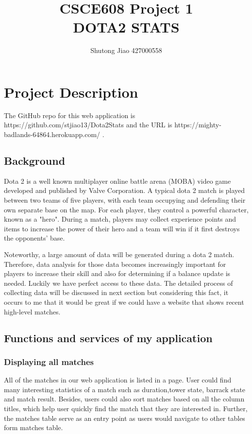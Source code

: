 \documentclass[a4paper]{article}
\title{CSCE608 Project 1\\
DOTA2 STATS}
\author{Shutong Jiao 427000558}
\begin{document}
\maketitle
\section{Project Description}
The GitHub repo for this web application is https://github.com/stjiao13/Dota2Stats and the URL is https://mighty-badlands-64864.herokuapp.com/ .
\subsection{Background}
Dota 2 is a well known multiplayer online battle arena (MOBA) video game developed and published by Valve Corporation. A typical dota 2 match is played between two teams of five players, with each team occupying and defending their own separate base on the map. For each player, they control a powerful character, known as a "hero". During a match, players may collect experience points and items to increase the power of their hero and a team will win if it first destroys the opponents' base.\par
\noindent Noteworthy, a large amount of data will be generated during a dota 2 match. Therefore, data analysis for those data becomes increasingly important for players to increase their skill and also for determining if a balance update is needed. Luckily we have perfect access to these data. The detailed process of collecting data will be discussed in next section but considering this fact, it occurs to me that it would be great if we could have a website that shows recent high-level matches. 
\subsection{Functions and services of my application}

\subsubsection{Displaying all matches}
All of the matches in our web application is listed in a page. User could find many interesting statistics of a match such as duration,tower state, barrack state and match result. Besides, users could also sort matches based on all the column titles, which help user quickly find the match that they are interested in. Further, the matches table serve as an entry point as users would navigate to other tables form matches table.
\end{document}
